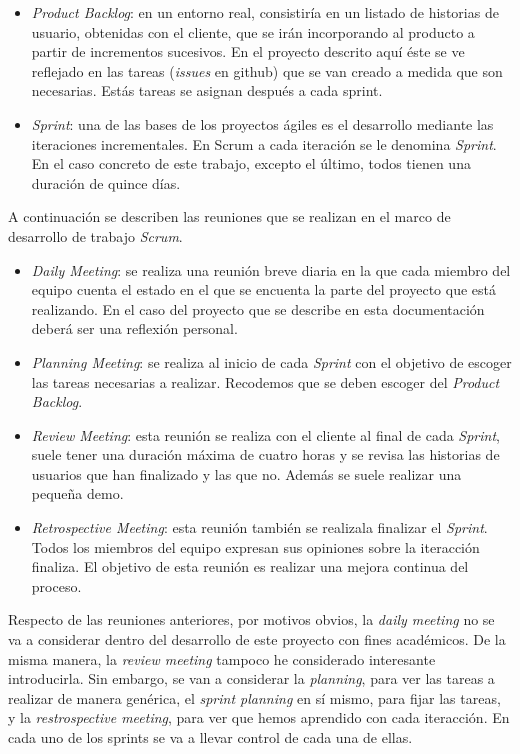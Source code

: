 \begin{itemize}	
	\item \textit{Product Backlog}: en un entorno real, consistiría en un listado de historias de usuario, obtenidas con el cliente, que se irán incorporando al producto a partir de incrementos sucesivos. En el proyecto descrito aquí éste se ve reflejado en las tareas (\textit{issues} en github) que se van creado a medida que son necesarias. Estás tareas se asignan después a cada sprint.
	\item \textit{Sprint}: una de las bases de los proyectos ágiles es el desarrollo mediante las iteraciones incrementales. En Scrum a cada iteración se le denomina \textit{Sprint}. En el caso concreto de este trabajo, excepto el último, todos tienen una duración de quince días.
\end{itemize}


A continuación se describen las reuniones que se realizan en el marco de desarrollo de trabajo \textit{Scrum}. 
\begin{itemize}	
	\item \textit{Daily Meeting}: se realiza una reunión breve diaria en la que cada miembro del equipo cuenta el estado en el que se encuenta la parte del proyecto que está realizando. En el caso del proyecto que se describe en esta documentación deberá ser una reflexión personal.
	\item \textit{Planning Meeting}: se realiza al inicio de cada \textit{Sprint} con el objetivo de escoger las tareas necesarias a realizar. Recodemos que se deben escoger del \textit{Product Backlog}.
	\item \textit{Review Meeting}:  esta reunión se realiza con el cliente al final de cada \textit{Sprint}, suele tener una duración máxima de cuatro horas y se revisa las historias de usuarios que han finalizado y las que no. Además se suele realizar una pequeña demo.
	\item \textit{Retrospective Meeting}: esta reunión también se realizala finalizar el \textit{Sprint}. Todos los miembros del equipo expresan sus opiniones sobre la iteracción finaliza. El objetivo de esta reunión es realizar una mejora continua del proceso. 
\end{itemize}

Respecto de las reuniones anteriores, por motivos obvios, la \textit{daily meeting} no se va a considerar dentro del desarrollo de este proyecto con fines académicos. De la misma manera, la \textit{review meeting} tampoco he considerado interesante introducirla. Sin embargo, se van a considerar la \textit{planning}, para ver las tareas a realizar de manera genérica, el \textit{sprint planning} en sí mismo, para fijar las tareas, y la \textit{restrospective meeting}, para ver que hemos aprendido con cada iteracción. En cada uno de los sprints se va a llevar control de cada una de ellas. 

